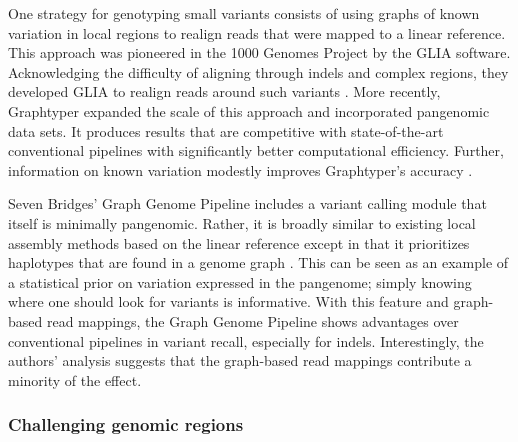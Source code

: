 One strategy for genotyping small variants consists of using graphs of known variation in local regions to realign reads that were mapped to a linear reference.
This approach was pioneered in the 1000 Genomes Project by the GLIA software.
Acknowledging the difficulty of aligning through indels and complex regions, they developed GLIA to realign reads around such variants \cite{1000_2015}.
More recently, Graphtyper expanded the scale of this approach and incorporated pangenomic data sets.
It produces results that are competitive with state-of-the-art conventional pipelines with significantly better computational efficiency.
Further, information on known variation modestly improves Graphtyper's accuracy \cite{eggertsson2017graphtyper}.

Seven Bridges' Graph Genome Pipeline includes a variant calling module that itself is minimally pangenomic.
Rather, it is broadly similar to existing local assembly methods based on the linear reference \cite{Poplin_2017, Rimmer_2014} except in that it prioritizes haplotypes that are found in a genome graph \cite{Rakocevic_2019}.
This can be seen as an example of a statistical prior on variation expressed in the pangenome; simply knowing where one should look for variants is informative.
With this feature and graph-based read mappings, the Graph Genome Pipeline shows advantages over conventional pipelines in variant recall, especially for indels.
Interestingly, the authors' analysis suggests that the graph-based read mappings contribute a minority of the effect.

%

\subsubsection{Challenging genomic regions}

